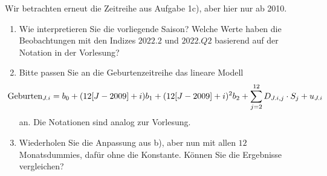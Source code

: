 Wir betrachten erneut die Zeitreihe aus Aufgabe 1c), aber hier nur ab 2010.

\begin{enumerate}

\item Wie interpretieren Sie die vorliegende Saison? Welche Werte haben die Beobachtungen mit den Indizes $2022.2$ und $2022.Q2$ basierend auf der Notation in der Vorlesung?


\item Bitte passen Sie an die Geburtenzeitreihe das lineare Modell
\begin{align*}
\hspace{-0.5cm}
\text{Geburten}_{J.i} = b_0 + (12[J - 2009] + i)b_1 + (12[J - 2009] + i)^2b_2 + \sum_{j = 2}^{12} D_{J.i,j} \cdot S_j + u_{J.i}
\end{align*}
an. Die Notationen sind analog zur Vorlesung.


\item Wiederholen Sie die Anpassung aus b), aber nun mit allen $12$ Monatsdummies, dafür ohne die Konstante. Können Sie die Ergebnisse vergleichen?


\end{enumerate}


